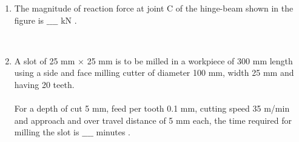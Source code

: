 \documentclass[journal]{IEEEtran}
\begin{document}
\begin{enumerate}
{nearest\ integer}. \\
\item The magnitude of reaction force at joint C of the hinge-beam shown in the figure is $\_\_\_\_$ kN .
\begin{figure}[!ht]
\centering
\resizebox{0.5\textwidth}{!}{%

}%
\end{figure}\\
\item A slot of 25 mm $\times$ 25 mm is to be milled in a workpiece of 300 mm length using a side and face milling cutter of diameter 100 mm, width 25 mm and having 20 teeth.\\\\
For a depth of cut 5 mm, feed per tooth 0.1 mm, cutting speed 35 m/min and approach and over travel distance of 5 mm each, the time required for milling the slot is $\_\_\_\_$ minutes . \\
			 \end{enumerate}
			 
\end{document}
